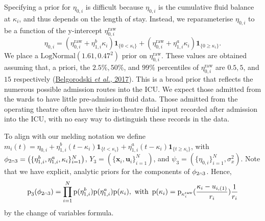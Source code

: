 \documentclass[
  10pt,
  a4paper,
]{article}
\let\Oldcap\cap
\renewcommand{\cap}{\mathrel{\mathsmaller{\Oldcap}}}
\newcommand{\pd}{\text{p}}
\begin{document}
Specifying a prior for \(\eta_{0, i}\) is difficult because
\(\eta_{0, i}\) is the cumulative fluid balance at \(\kappa_{i}\), and
thus depends on the length of stay. Instead, we reparameterise
\(\eta_{0, i}\) to be a function of the y-intercept
\(\eta_{0, i}^{\text{raw}}\) \begin{equation}
  \eta_{0, i} =
    (\eta_{0, i}^{\text{raw}} + \eta^{b}_{1, i} \kappa_{i}) \boldsymbol{1}_{\{0 < \kappa_{i}\}} +
    (\eta_{0, i}^{\text{raw}} + \eta^{a}_{1, i} \kappa_{i}) \boldsymbol{1}_{\{0 \geq \kappa_{i}\}}.
\end{equation} We place a \(\text{LogNormal}(1.61, 0.47^2)\) prior on
\(\eta_{0, i}^{\text{raw}}\). These values are obtained assuming that, a
priori, the \(2.5\%, 50\%\), and \(99\%\) percentiles of
\(\eta_{0, i}^{\text{raw}}\) are \(0.5, 5\), and \(15\) respectively
(\protect\hyperlink{ref-belgorodski_rriskdistributions_2017}{Belgorodski
\emph{et al.}, 2017}). This is a broad prior that reflects the numerous
possible admission routes into the ICU. We expect those admitted from
the wards to have little pre-admission fluid data. Those admitted from
the operating theatre often have their in-theatre fluid input recorded
after admission into the ICU, with no easy way to distinguish these
records in the data.

To align with our melding notation we define
\(m_{i}(t) = \eta_{0, i} + \eta^{b}_{1, i}(t - \kappa_{i})\boldsymbol{1}_{\{t < \kappa_{i}\}} + \eta^{a}_{1, i}(t - \kappa_{i})\boldsymbol{1}_{\{t \geq \kappa_{i}\}}\),
with
\(\phi_{2 \cap 3} = \left(\{\eta^{b}_{1, i}, \eta^{a}_{1, i}, \kappa_{i}\}_{i = 1}^{N}\right)\),
\(Y_{3} = (\{\boldsymbol{x}_{i}, \boldsymbol{u}_{i}\}_{i = 1}^{N})\),
and \(\psi_{3} = (\{\eta_{0, i}\}_{i = 1}^{N}, \sigma^{2}_{x})\). Note
that we have explicit, analytic priors for the components of
\(\phi_{2 \cap 3}\). Hence, \begin{equation}
  \pd_{3}(\phi_{2 \cap 3}) = \prod_{i = 1}^{N} \pd(\eta^{b}_{1, i}) \pd(\eta^{a}_{1, i}) \pd(\kappa_{i}), \,\, \text{with} \,\,\,
  \pd(\kappa_{i}) = \pd_{\kappa^{\text{raw}}_{i}}(\frac{\kappa_{i} - u_{i, (1)}}{r_{i}}) \frac{1}{r_{i}}
\end{equation} by the change of variables formula.
\end{document}

